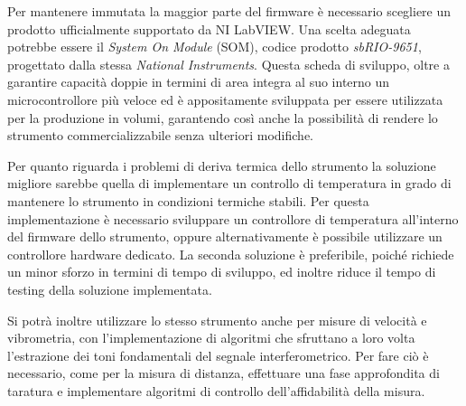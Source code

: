 Per mantenere immutata la maggior parte del firmware è necessario scegliere un prodotto ufficialmente supportato da NI LabVIEW. Una scelta adeguata potrebbe essere il \textit{System On Module} (SOM), codice prodotto \textit{sbRIO-9651}, progettato dalla stessa \textit{National Instruments}. Questa scheda di sviluppo, oltre a garantire capacità doppie in termini di area integra al suo interno un microcontrollore più veloce ed è appositamente sviluppata per essere utilizzata per la produzione in volumi, garantendo così anche la possibilità di rendere lo strumento commercializzabile senza ulteriori modifiche.

Per quanto riguarda i problemi di deriva termica dello strumento la soluzione migliore sarebbe quella di implementare un controllo di temperatura in grado di mantenere lo strumento in condizioni termiche stabili. Per questa implementazione è necessario sviluppare un controllore di temperatura all'interno del firmware dello strumento, oppure alternativamente è possibile utilizzare un controllore hardware dedicato. La seconda soluzione è preferibile, poiché richiede un minor sforzo in termini di tempo di sviluppo, ed inoltre riduce il tempo di testing della soluzione implementata.

Si potrà inoltre utilizzare lo stesso strumento anche per misure di velocità e vibrometria, con l'implementazione di algoritmi che sfruttano a loro volta l'estrazione dei toni fondamentali del segnale interferometrico. Per fare ciò è necessario, come per la misura di distanza, effettuare una fase approfondita di taratura e implementare algoritmi di controllo dell'affidabilità della misura.



